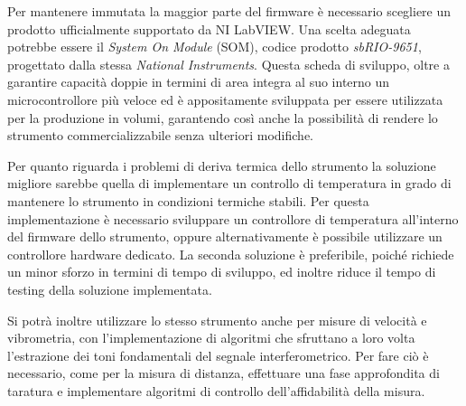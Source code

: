 Per mantenere immutata la maggior parte del firmware è necessario scegliere un prodotto ufficialmente supportato da NI LabVIEW. Una scelta adeguata potrebbe essere il \textit{System On Module} (SOM), codice prodotto \textit{sbRIO-9651}, progettato dalla stessa \textit{National Instruments}. Questa scheda di sviluppo, oltre a garantire capacità doppie in termini di area integra al suo interno un microcontrollore più veloce ed è appositamente sviluppata per essere utilizzata per la produzione in volumi, garantendo così anche la possibilità di rendere lo strumento commercializzabile senza ulteriori modifiche.

Per quanto riguarda i problemi di deriva termica dello strumento la soluzione migliore sarebbe quella di implementare un controllo di temperatura in grado di mantenere lo strumento in condizioni termiche stabili. Per questa implementazione è necessario sviluppare un controllore di temperatura all'interno del firmware dello strumento, oppure alternativamente è possibile utilizzare un controllore hardware dedicato. La seconda soluzione è preferibile, poiché richiede un minor sforzo in termini di tempo di sviluppo, ed inoltre riduce il tempo di testing della soluzione implementata.

Si potrà inoltre utilizzare lo stesso strumento anche per misure di velocità e vibrometria, con l'implementazione di algoritmi che sfruttano a loro volta l'estrazione dei toni fondamentali del segnale interferometrico. Per fare ciò è necessario, come per la misura di distanza, effettuare una fase approfondita di taratura e implementare algoritmi di controllo dell'affidabilità della misura.



